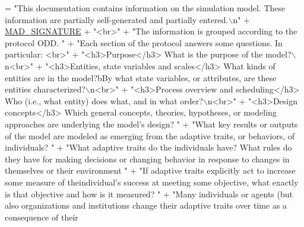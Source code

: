 \begin{DoxyCode}
= \textcolor{stringliteral}{"This documentation contains information on the simulation model. These information are partially
       self-generated and partially entered.\(\backslash\)n"}            
                                             + \hyperlink{classit_1_1isislab_1_1masonassisteddocumentation_1_1mason_1_1analizer_1_1_global_utility_ad6c866fb747d2689e54290c69ebfe1ce}{MAD\_SIGNATURE} + \textcolor{stringliteral}{"<br>"} 
                                             + \textcolor{stringliteral}{"The information is grouped according to the protocol ODD. "}
                                             + \textcolor{stringliteral}{"Each section of the protocol answers some questions. In
       particular: <br>"}
                                             + \textcolor{stringliteral}{"<h3>Purpose</h3> What is the purpose of the model?\(\backslash\)n<br>"}
                                             + \textcolor{stringliteral}{"<h3>Entities, state variables and scales</h3> What kinds of
       entities are in the model?bBy what state variables, or attributes, are these entities characterized?\(\backslash\)n<br>"}
                                             + \textcolor{stringliteral}{"<h3>Process overview and scheduling</h3> Who (i.e., what
       entity) does what, and in what order?\(\backslash\)n<br>"}
                                             + \textcolor{stringliteral}{"<h3>Design concepts</h3> Which general concepts, theories,
       hypotheses, or modeling approaches are underlying the model's design? "}
                                             +                            \textcolor{stringliteral}{"What key results or outputs of
       the model are modeled as emerging from the adaptive traits, or behaviors, of individuals? "}   
                                             +                            \textcolor{stringliteral}{"What adaptive traits do the
       individuals have? What rules do they have for making decisions or changing behavior in response to changes in
       themselves or their environment "}
                                             +                            \textcolor{stringliteral}{"If adaptive traits explicitly
       act to increase some measure of theindividual's success at meeting some objective, what exactly is that
       objective and how is it measured? "}
                                             +                            \textcolor{stringliteral}{"Many individuals or agents (but
       also organizations and institutions change their adaptive traits over time as a consequence of their
}
\end{DoxyCode}
